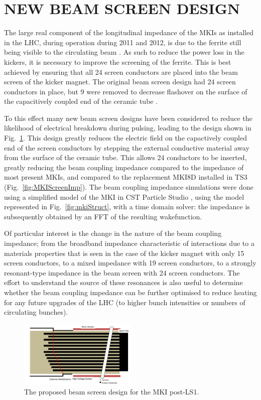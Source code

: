 \documentclass{JAC2003}
\begin{document}
\section{NEW BEAM SCREEN DESIGN}

The large real component of the longitudinal impedance of the MKIs as installed in the LHC, during operation during 2011 and 2012, is due to the ferrite still being visible to the circulating beam \cite{kicker_meas}. As such to reduce the power loss in the kickers, it is necessary to improve the screening of the ferrite. This is best achieved by ensuring that all 24 screen conductors are placed into the beam screen of the kicker magnet. The original beam screen design had 24 screen conductors in place, but 9 were removed to decrease flashover on the surface of the capacitively coupled end of the ceramic tube \cite{mki-ElecBreakdown}. 

To this effect many new beam screen designs have been considered to reduce the likelihood of electrical breakdown during pulsing, leading to the design shown in Fig.~\ref{fig:newScreenDesign}. This design greatly reduces the electric field on the capactively coupled end of the screen conductors by stepping the external conductive material away from the surface of the ceramic tube. This allows 24 conductors to be inserted, greatly reducing the beam coupling impedance compared to the impedance of most present MKIs, and compared to the replacement MKI8D installed in TS3 (Fig.~\ref{fig:MKIScreenImp}). The beam coupling impedance simulations were done using a simplified model of the MKI in CST Particle Studio \cite{cst-cite}, using the model represented in Fig.~\ref{fig:mkiStruct}, with a time domain solver: the impedance is subsequently obtained by an FFT of the resulting wakefunction. 

Of particular interest is the change in the nature of the beam coupling impedance; from the broadband impedance characteristic of interactions due to a materials properties that is seen in the case of the kicker magnet with only 15 screen conductors, to a mixed impedance with 19 screen conductors, to a strongly resonant-type impedance in the beam screen with 24 screen conductors. The effort to understand the source of these resonances is also useful to determine whether the beam coupling impedance can be further optimised to reduce heating for any future upgrades of the LHC (to higher bunch intensities or numbers of circulating bunches).

\begin{figure}
\includegraphics[width=0.5\textwidth]{TUPME033f2.pdf}
\caption{The proposed beam screen design for the MKI post-LS1.}
\label{fig:newScreenDesign}
\end{figure}
\end{document}
